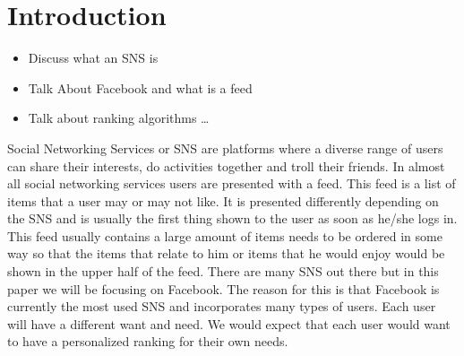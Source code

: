 \chapter{Introduction}\label{ch:intro}

\begin{itemize}
  \item Discuss what an SNS is
  \item Talk About Facebook and what is a feed
  \item Talk about ranking algorithms
\ldots
\end{itemize}

Social Networking Services or SNS are platforms where a diverse range of users can share their interests, do activities together and troll their friends. In almost all social networking services users are presented with a feed. This feed is a list of items that a user may or may not like. It is presented differently depending on the SNS and is usually the first thing shown to the user as soon as he/she logs in. This feed usually contains a large amount of items needs to be ordered in some way so that the items that relate to him or items that he would enjoy would be shown in the upper half of the feed. There are many SNS out there but in this paper we will be focusing on Facebook. The reason for this is that Facebook is currently the most used SNS and incorporates many types of users. Each user will have a different want and need. We would expect that each user would want to have a personalized ranking for their own needs.





